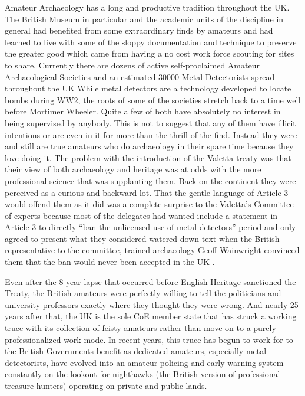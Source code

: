 Amateur Archaeology has a long and productive tradition throughout the UK. The British Museum in particular and the academic units of the discipline in general had benefited from some extraordinary finds by amateurs and had learned to live with some of the sloppy documentation and technique to preserve the greater good which came from having a no cost work force scouting for sites to share. Currently there are dozens of active self-proclaimed Amateur Archaeological Societies and an estimated \num{30000} 
Metal Detectorists spread throughout the UK \parencites{finlo2006}{potts2015}%
While metal detectors are a technology developed to locate bombs during WW2, the roots of some of the societies stretch back to a time well before Mortimer Wheeler. Quite a few of both have absolutely no interest in being supervised by anybody. This is not to suggest that any of them have illicit intentions or are even in it for more than the thrill of the find. Instead they were and still are true amateurs who do archaeology in their spare time because they love doing it. The problem with the introduction of the Valetta treaty was that their view of both archaeology and heritage was at odds with the more professional science that was supplanting them. Back on the continent they were perceived as a curious and backward lot. That the gentle language of Article 3 would offend them as it did was a complete surprise to the Valetta’s Committee of experts because most of the delegates had wanted include a statement in Article 3 to directly “ban the unlicensed use of metal detectors” period and only agreed to present what they considered watered down text when the British representative to the committee, trained archaeology Geoff Wainwright convinced them that the ban would never been accepted in the UK \parencite[62]{willems2007}. 

Even after the \num{8} year lapse that occurred before English Heritage sanctioned the Treaty, the British amateurs were perfectly willing to tell the politicians and university professors exactly where they thought they were wrong. And nearly \num{25} years after that, the UK is the sole CoE member state that has struck a working truce with its collection of feisty amateurs rather than move on to a purely professionalized work mode. In recent years, this truce has begun to work for to the British Governments benefit as dedicated amateurs, especially metal detectorists, have evolved into an amateur policing and early warning system constantly on the lookout for nighthawks (the British version of professional treasure hunters) operating on private and public lands. 


